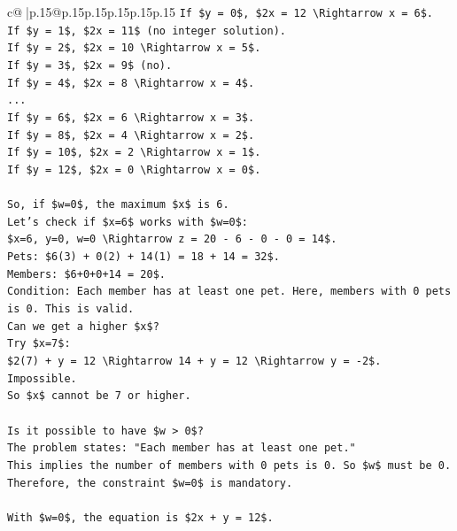 \documentclass{article}
\begin{document}
{\begin{supertabular}{c@{$\;$}|p{.15\linewidth}@{}p{.15\linewidth}p{.15\linewidth}p{.15\linewidth}p{.15\linewidth}p{.15\linewidth}}
{{{\texttt{If \$y = 0\$, \$2x = 12 \textbackslash{}Rightarrow x = 6\$.} \\
\texttt{If \$y = 1\$, \$2x = 11\$ (no integer solution).} \\
\texttt{If \$y = 2\$, \$2x = 10 \textbackslash{}Rightarrow x = 5\$.} \\
\texttt{If \$y = 3\$, \$2x = 9\$ (no).} \\
\texttt{If \$y = 4\$, \$2x = 8 \textbackslash{}Rightarrow x = 4\$.} \\
\texttt{...} \\
\texttt{If \$y = 6\$, \$2x = 6 \textbackslash{}Rightarrow x = 3\$.} \\
\texttt{If \$y = 8\$, \$2x = 4 \textbackslash{}Rightarrow x = 2\$.} \\
\texttt{If \$y = 10\$, \$2x = 2 \textbackslash{}Rightarrow x = 1\$.} \\
\texttt{If \$y = 12\$, \$2x = 0 \textbackslash{}Rightarrow x = 0\$.} \\
\\ 
\texttt{So, if \$w=0\$, the maximum \$x\$ is 6.} \\
\texttt{Let's check if \$x=6\$ works with \$w=0\$:} \\
\texttt{\$x=6, y=0, w=0 \textbackslash{}Rightarrow z = 20 {-} 6 {-} 0 {-} 0 = 14\$.} \\
\texttt{Pets: \$6(3) + 0(2) + 14(1) = 18 + 14 = 32\$.} \\
\texttt{Members: \$6+0+0+14 = 20\$.} \\
\texttt{Condition: Each member has at least one pet. Here, members with 0 pets is 0. This is valid.} \\
\texttt{Can we get a higher \$x\$?} \\
\texttt{Try \$x=7\$:} \\
\texttt{\$2(7) + y = 12 \textbackslash{}Rightarrow 14 + y = 12 \textbackslash{}Rightarrow y = {-}2\$. Impossible.} \\
\texttt{So \$x\$ cannot be 7 or higher.} \\
\\ 
\texttt{Is it possible to have \$w > 0\$?} \\
\texttt{The problem states: "Each member has at least one pet."} \\
\texttt{This implies the number of members with 0 pets is 0. So \$w\$ must be 0.} \\
\texttt{Therefore, the constraint \$w=0\$ is mandatory.} \\
\\ 
\texttt{With \$w=0\$, the equation is \$2x + y = 12\$.} \\
}}}
\end{supertabular}}
\end{document}
